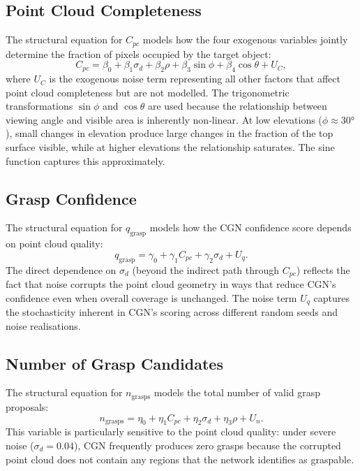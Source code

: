 \documentclass[11pt,a4paper]{report}
\begin{document}
\subsection{Point Cloud Completeness}

The structural equation for $C_{pc}$ models how the four exogenous variables jointly determine the fraction of pixels occupied by the target object:
\begin{equation}
  C_{pc} = \beta_0 + \beta_1 \sigma_d + \beta_2 \rho
           + \beta_3 \sin\phi + \beta_4 \cos\theta + U_C,
  \label{eq:cpc}
\end{equation}
where $U_C$ is the exogenous noise term representing all other factors that affect point cloud completeness but are not modelled. The trigonometric transformations $\sin\phi$ and $\cos\theta$ are used because the relationship between viewing angle and visible area is inherently non-linear. At low elevations ($\phi \approx 30°$), small changes in elevation produce large changes in the fraction of the top surface visible, while at higher elevations the relationship saturates. The sine function captures this approximately.

\subsection{Grasp Confidence}

The structural equation for $q_{\text{grasp}}$ models how the CGN confidence score depends on point cloud quality:
\begin{equation}
  q_{\text{grasp}} = \gamma_0 + \gamma_1 C_{pc} + \gamma_2 \sigma_d + U_q.
  \label{eq:qg}
\end{equation}
The direct dependence on $\sigma_d$ (beyond the indirect path through $C_{pc}$) reflects the fact that noise corrupts the point cloud geometry in ways that reduce CGN's confidence even when overall coverage is unchanged. The noise term $U_q$ captures the stochasticity inherent in CGN's scoring across different random seeds and noise realisations.

\subsection{Number of Grasp Candidates}

The structural equation for $n_{\text{grasps}}$ models the total number of valid grasp proposals:
\begin{equation}
  n_{\text{grasps}} = \eta_0 + \eta_1 C_{pc} + \eta_2 \sigma_d + \eta_3 \rho + U_n.
  \label{eq:ng}
\end{equation}
This variable is particularly sensitive to the point cloud quality: under severe noise ($\sigma_d = 0.04$), CGN frequently produces zero grasps because the corrupted point cloud does not contain any regions that the network identifies as graspable.
\end{document}
